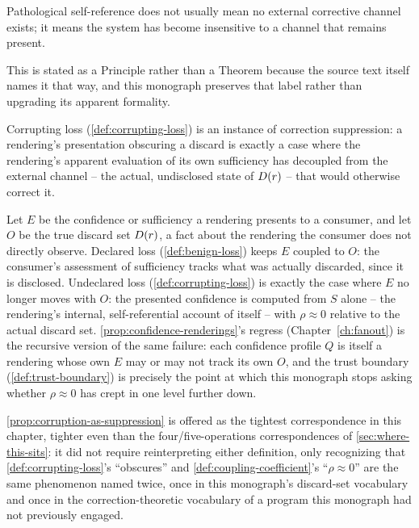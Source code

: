 \begin{principle}
\label{principle:correction-suppression}
Pathological self-reference does not usually mean no external corrective
channel exists; it means the system has become insensitive to a channel
that remains present.
\end{principle}

This is stated as a Principle rather than a Theorem because the source
text itself names it that way, and this monograph preserves that label
rather than upgrading its apparent formality.

\begin{proposition}
\label{prop:corruption-as-suppression}
Corrupting loss (\cref{def:corrupting-loss}) is an instance of correction
suppression: a rendering's presentation obscuring a discard is exactly a
case where the rendering's apparent evaluation of its own sufficiency has
decoupled from the external channel -- the actual, undisclosed state of
$D(r)$ -- that would otherwise correct it.
\end{proposition}

\begin{proofsketch}
Let $E$ be the confidence or sufficiency a rendering presents to a
consumer, and let $O$ be the true discard set $D(r)$, a fact about
the rendering the consumer does not directly observe. Declared loss
(\cref{def:benign-loss}) keeps $E$ coupled to $O$: the consumer's
assessment of sufficiency tracks what was actually discarded, since it is
disclosed. Undeclared loss (\cref{def:corrupting-loss}) is exactly the
case where $E$ no longer moves with $O$: the presented confidence is
computed from $S$ alone -- the rendering's internal, self-referential
account of itself -- with $\rho \approx 0$ relative to the actual discard
set. \cref{prop:confidence-renderings}'s regress (Chapter~\ref{ch:fanout})
is the recursive version of the same failure: each confidence profile
$Q$ is itself a rendering whose own $E$ may or may not track its own
$O$, and the trust boundary (\cref{def:trust-boundary}) is precisely the
point at which this monograph stops asking whether $\rho \approx 0$ has
crept in one level further down.
\end{proofsketch}

\cref{prop:corruption-as-suppression} is offered as the tightest
correspondence in this chapter, tighter even than the four/five-operations
correspondences of \cref{sec:where-this-sits}: it did not require
reinterpreting either definition, only recognizing that
\cref{def:corrupting-loss}'s ``obscures'' and \cref{def:coupling-coefficient}'s
``$\rho \approx 0$'' are the same phenomenon named twice, once in this
monograph's discard-set vocabulary and once in the correction-theoretic
vocabulary of a program this monograph had not previously engaged.

